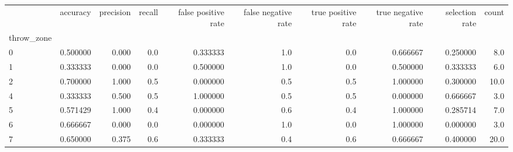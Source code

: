 \begin{tabular}{lrrrrrrrrr}
\toprule
{} &  accuracy &  precision &  recall &  false positive rate &  false negative rate &  true positive rate &  true negative rate &  selection rate &  count \\
throw\_zone &           &            &         &                      &                      &                     &                     &                 &        \\
\midrule
0          &  0.500000 &      0.000 &     0.0 &             0.333333 &                  1.0 &                 0.0 &            0.666667 &        0.250000 &    8.0 \\
1          &  0.333333 &      0.000 &     0.0 &             0.500000 &                  1.0 &                 0.0 &            0.500000 &        0.333333 &    6.0 \\
2          &  0.700000 &      1.000 &     0.5 &             0.000000 &                  0.5 &                 0.5 &            1.000000 &        0.300000 &   10.0 \\
4          &  0.333333 &      0.500 &     0.5 &             1.000000 &                  0.5 &                 0.5 &            0.000000 &        0.666667 &    3.0 \\
5          &  0.571429 &      1.000 &     0.4 &             0.000000 &                  0.6 &                 0.4 &            1.000000 &        0.285714 &    7.0 \\
6          &  0.666667 &      0.000 &     0.0 &             0.000000 &                  1.0 &                 0.0 &            1.000000 &        0.000000 &    3.0 \\
7          &  0.650000 &      0.375 &     0.6 &             0.333333 &                  0.4 &                 0.6 &            0.666667 &        0.400000 &   20.0 \\
\bottomrule
\end{tabular}
